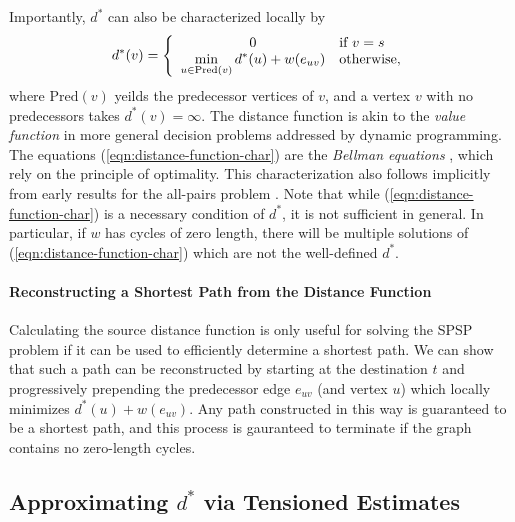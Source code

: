 Importantly, $d^*$ can also be characterized locally by
\begin{equation}
   d^*(v) = 
   \left\{ \begin{array}{cl}
      0 & \mbox{if } v = s \\
      \displaystyle\min_{u \in \mbox{\scriptsize Pred}(v)} d^*(u) + w(e_{uv}) & \mbox{otherwise,} \\
   \end{array} \right.
   \label{eqn:distance-function-char}
\end{equation}
where $\mbox{Pred}(v)$ yeilds the predecessor vertices of $v$,
and a vertex $v$ with no predecessors takes $d^*(v) = \infty$.
The distance function is akin to the \emph{value function}
in more general decision problems addressed by dynamic programming.
The equations (\ref{eqn:distance-function-char})
are the \emph{Bellman equations} \citep{bellman1958routing},
which rely on the principle of optimality.
This characterization also follows implicitly from early results for
the all-pairs problem
\citep{shimbel1955communicationnets, beckmann1955transportation}.
Note that while (\ref{eqn:distance-function-char})
is a necessary condition of $d^*$,
it is not sufficient in general.
In particular,
if $w$ has cycles of zero length,
there will be multiple solutions of (\ref{eqn:distance-function-char})
which are not the well-defined $d^*$.

\paragraph{Reconstructing a Shortest Path from the Distance Function}
Calculating the source distance function is only useful for solving
the SPSP problem if it can be used to efficiently determine
a shortest path.
We can show that such a path can be reconstructed by starting at
the destination $t$ and progressively prepending the predecessor
edge $e_{uv}$ (and vertex $u$)
which locally minimizes $d^*(u) + w(e_{uv})$.
Any path constructed in this way is guaranteed to be a shortest path,
and this process is gauranteed to terminate if the graph
contains no zero-length cycles.

\subsection{Approximating $d^*$ via Tensioned Estimates}
\label{subsec:ibid-tension}

